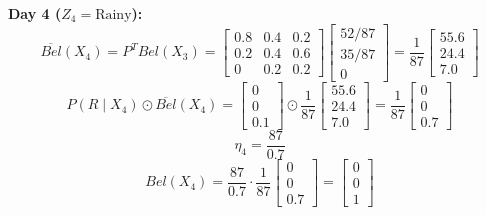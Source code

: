 \documentclass{article}
\begin{document}
\begin{enumerate}
    \textbf{Day 4 ($Z_4 = \text{Rainy}$):}
    $$ \overline{Bel}(X_4) = P^T Bel(X_3) = \begin{bmatrix} 0.8 & 0.4 & 0.2 \\ 0.2 & 0.4 & 0.6 \\ 0 & 0.2 & 0.2 \end{bmatrix} \begin{bmatrix} 52/87 \\ 35/87 \\ 0 \end{bmatrix} = \frac{1}{87} \begin{bmatrix} 55.6 \\ 24.4 \\ 7.0 \end{bmatrix} $$
    $$ P(R \mid X_4) \odot \overline{Bel}(X_4) = \begin{bmatrix} 0 \\ 0 \\ 0.1 \end{bmatrix} \odot \frac{1}{87} \begin{bmatrix} 55.6 \\ 24.4 \\ 7.0 \end{bmatrix} = \frac{1}{87} \begin{bmatrix} 0 \\ 0 \\ 0.7 \end{bmatrix} $$
    $$ \eta_4 = \frac{87}{0.7} $$
    $$ Bel(X_4) = \frac{87}{0.7} \cdot \frac{1}{87} \begin{bmatrix} 0 \\ 0 \\ 0.7 \end{bmatrix} = \begin{bmatrix} 0 \\ 0 \\ 1 \end{bmatrix} $$


\end{enumerate}
\end{document}
